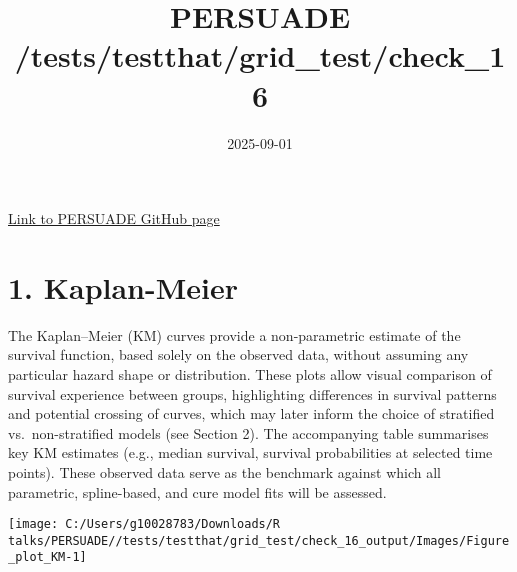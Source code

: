\documentclass[
]{article}
\title{PERSUADE /tests/testthat/grid\_test/check\_16}
\author{}
\date{\vspace{-2.5em}2025-09-01}
\begin{document}
\maketitle

{
\hypersetup{linkcolor=}
\setcounter{tocdepth}{2}
\tableofcontents
}
\hfill\break

\href{https://github.com/Bram-R/PERSUADE}{Link to PERSUADE GitHub page}

\clearpage

\section{1. Kaplan-Meier}\label{kaplan-meier}

The Kaplan--Meier (KM) curves provide a non-parametric estimate of the
survival function, based solely on the observed data, without assuming
any particular hazard shape or distribution. These plots allow visual
comparison of survival experience between groups, highlighting
differences in survival patterns and potential crossing of curves, which
may later inform the choice of stratified vs.~non-stratified models (see
Section 2). The accompanying table summarises key KM estimates (e.g.,
median survival, survival probabilities at selected time points). These
observed data serve as the benchmark against which all parametric,
spline-based, and cure model fits will be assessed.

\clearpage

\begin{flushleft}\texttt{[image: C:/Users/g10028783/Downloads/R talks/PERSUADE//tests/testthat/grid\_test/check\_16\_output/Images/Figure\_plot\_KM-1]} \end{flushleft}

\begin{table}[H]
\centering
\caption{\label{tab:Table_1}Observed survival data}
\centering
{}
\end{table}
\end{document}
